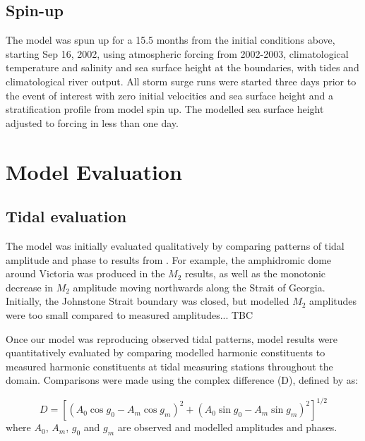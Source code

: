 \documentclass[pdftex,10pt]{article}
\begin{document}
\subsection{Spin-up}
The model was spun up for a 15.5 months from the initial conditions above, starting Sep 16, 2002, using atmospheric forcing from 2002-2003, climatological temperature and salinity and sea surface height at the boundaries, with tides and climatological river output.  All storm surge runs were started three days prior to the event of interest with zero initial velocities and sea surface height and a stratification profile from model spin up. The modelled sea surface height adjusted to forcing in less than one day. 

\section{Model Evaluation}\label{sec:model}

\subsection{Tidal evaluation}
The model was initially evaluated qualitatively by comparing patterns of tidal amplitude and phase to results from \citep{foreman1995tidal}. For example, the amphidromic dome around Victoria was produced in the $M_2$ results, as well as the monotonic decrease in $M_2$ amplitude moving northwards along the Strait of Georgia. Initially, the Johnstone Strait boundary was closed, but modelled $M_2$ amplitudes were too small compared to measured amplitudes... TBC


Once our model was reproducing observed tidal patterns, model results were quantitatively evaluated by comparing modelled harmonic constituents to measured harmonic constituents at tidal measuring stations throughout the domain. Comparisons were made using the complex difference (D), defined by \citep{foreman1995tidal} as:

\begin{equation}
D = [(A_0 \cos g_0 - A_m \cos g_m)^2 + (A_0 \sin g_0 - A_m \sin g_m)^2]^{1/2}
\end{equation}
where $A_0$, $A_m$, $g_0$ and $g_m$ are observed and modelled amplitudes and phases.

\end{document}
